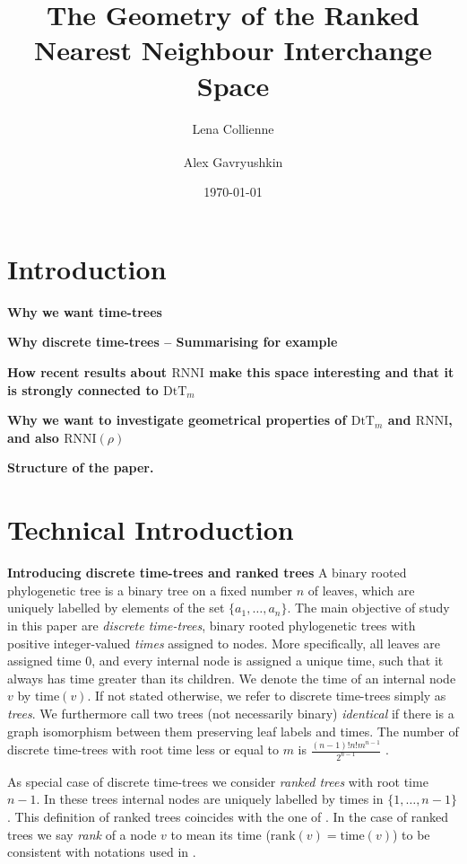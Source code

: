 \documentclass[11pt]{amsart}
\title[Geometry of ranked tree spaces]{The Geometry of the Ranked Nearest Neighbour Interchange Space}
\date{\today}
\author{Lena Collienne}
\author{Alex Gavryushkin\textsuperscript{\Letter}}
\newcommand{\rnni}{\mathrm{RNNI}}
\newcommand{\rank}{\mathrm{rank}}
\newcommand{\ntime}{\mathrm{time}}
\newcommand{\dtt}{\mathrm{DtT}}
\newcommand{\summary}[1]{\textbf{#1}} %
\begin{document}
\begin{abstract}
\end{abstract}

\maketitle


\section{Introduction}

\summary{Why we want time-trees}

\summary{Why discrete time-trees -- Summarising for example}

\summary{How recent results about $\rnni$ make this space interesting and that it is strongly connected to $\dtt_m$}

\summary{Why we want to investigate geometrical properties of $\dtt_m$ and $\rnni$, and also $\rnni(\rho)$}

\summary{Structure of the paper.}


\section{Technical Introduction}

\summary{Introducing discrete time-trees and ranked trees}
A binary rooted phylogenetic tree is a binary tree on a fixed number $n$ of leaves, which are uniquely labelled by elements of the set $\{a_1, \ldots, a_n\}$.
The main objective of study in this paper are \emph{discrete time-trees}, binary rooted phylogenetic trees with positive integer-valued \emph{times} assigned to nodes.
More specifically, all leaves are assigned time $0$, and every internal node is assigned a unique time, such that it always has time greater than its children.
We denote the time of an internal node $v$ by $\ntime(v)$.
If not stated otherwise, we refer to discrete time-trees simply as \emph{trees}.
We furthermore call two trees (not necessarily binary) \emph{identical} if there is a graph isomorphism between them preserving leaf labels and times.
The number of discrete time-trees with root time less or equal to $m$ is $\frac{(n-1)!n!m^{n-1}}{2^{n-1}}$ \autocite{Gavryushkin2018-ol}.

As special case of discrete time-trees we consider \emph{ranked trees} with root time $n-1$.
In these trees internal nodes are uniquely labelled by times in $\{1, \ldots, n-1\}$.
This definition of ranked trees coincides with the one of \textcite{Collienne2020-iu}.
In the case of ranked trees we say \emph{rank} of a node $v$ to mean its time ($\rank(v) = \ntime(v)$) to be consistent with notations used in \autocite{Collienne2020-iu}.
\end{document}
